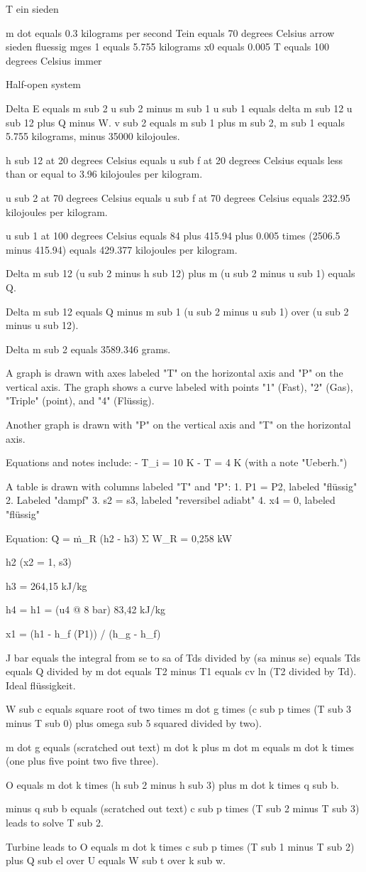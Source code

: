 T
ein sieden

m dot equals 0.3 kilograms per second  
Tein equals 70 degrees Celsius arrow sieden fluessig  
mges 1 equals 5.755 kilograms  
x0 equals 0.005  
T equals 100 degrees Celsius immer

Half-open system

Delta E equals m sub 2 u sub 2 minus m sub 1 u sub 1 equals delta m sub 12 u sub 12 plus Q minus W. v sub 2 equals m sub 1 plus m sub 2, m sub 1 equals 5.755 kilograms, minus 35000 kilojoules.

h sub 12 at 20 degrees Celsius equals u sub f at 20 degrees Celsius equals less than or equal to 3.96 kilojoules per kilogram.

u sub 2 at 70 degrees Celsius equals u sub f at 70 degrees Celsius equals 232.95 kilojoules per kilogram.

u sub 1 at 100 degrees Celsius equals 84 plus 415.94 plus 0.005 times (2506.5 minus 415.94) equals 429.377 kilojoules per kilogram.

Delta m sub 12 (u sub 2 minus h sub 12) plus m (u sub 2 minus u sub 1) equals Q.

Delta m sub 12 equals Q minus m sub 1 (u sub 2 minus u sub 1) over (u sub 2 minus u sub 12).

Delta m sub 2 equals 3589.346 grams.

A graph is drawn with axes labeled "T" on the horizontal axis and "P" on the vertical axis. The graph shows a curve labeled with points "1" (Fast), "2" (Gas), "Triple" (point), and "4" (Flüssig). 

Another graph is drawn with "P" on the vertical axis and "T" on the horizontal axis. 

Equations and notes include:
- T_i = 10 K
- T = 4 K (with a note "Ueberh.")

A table is drawn with columns labeled "T" and "P":
1. P1 = P2, labeled "flüssig"
2. Labeled "dampf"
3. s2 = s3, labeled "reversibel adiabt"
4. x4 = 0, labeled "flüssig"

Equation:
Q̇ = ṁ_R (h2 - h3)
Σ W_R = 0,258 kW

h2 (x2 = 1, s3)

h3 = 264,15 kJ/kg

h4 = h1 = (u4 @ 8 bar) 83,42 kJ/kg

x1 = (h1 - h_f (P1)) / (h_g - h_f)

J bar equals the integral from se to sa of Tds divided by (sa minus se) equals Tds equals Q divided by m dot equals T2 minus T1 equals cv ln (T2 divided by Td). Ideal flüssigkeit.

W sub c equals square root of two times m dot g times (c sub p times (T sub 3 minus T sub 0) plus omega sub 5 squared divided by two).

m dot g equals (scratched out text) m dot k plus m dot m equals m dot k times (one plus five point two five three).

O equals m dot k times (h sub 2 minus h sub 3) plus m dot k times q sub b.

minus q sub b equals (scratched out text) c sub p times (T sub 2 minus T sub 3) leads to solve T sub 2.

Turbine leads to O equals m dot k times c sub p times (T sub 1 minus T sub 2) plus Q sub el over U equals W sub t over k sub w.